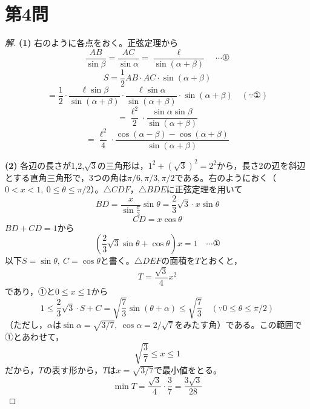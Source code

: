 \documentclass[../main.tex]{subfiles}
\begin{document}
\newpage

\section*{第4問}

\begin{proof}[解]
  \textbf{(1)} 右のように各点をおく。正弦定理から
  \[
    \frac{AB}{\sin\beta}=\frac{AC}{\sin\alpha}=\frac{\ell}{\sin(\alpha+\beta)} \quad\cdots\text{①}
  \]
  \[
    S=\frac12AB\cdot AC\cdot\sin(\alpha+\beta)
  \]
  \[
    =\frac12\cdot\frac{\ell\sin\beta}{\sin(\alpha+\beta)}\cdot\frac{\ell\sin\alpha}{\sin(\alpha+\beta)}\cdot\sin(\alpha+\beta) \quad(\because①)
  \]
  \[
    =\frac{\ell^2}{2}\cdot\frac{\sin\alpha\sin\beta}{\sin(\alpha+\beta)}
  \]
  \[
    =\frac{\ell^2}{4}\cdot\frac{\cos(\alpha-\beta)-\cos(\alpha+\beta)}{\sin(\alpha+\beta)}
  \]

  \textbf{(2)} 各辺の長さが1,2,$\sqrt3$の三角形は，$1^2+(\sqrt3)^2=2^2$から，長さ2の辺を斜辺とする直角三角形で，3つの角は$\pi/6,\pi/3,\pi/2$である。右のようにおく（$0<x<1,\ 0\le\theta\le\pi/2$）。$\triangle CDF$，$\triangle BDE$に正弦定理を用いて
  \[
    BD=\frac{x}{\sin\frac\pi3}\sin\theta=\frac23\sqrt3\cdot x\sin\theta
  \]
  \[
    CD=x\cos\theta
  \]
  $BD+CD=1$から
  \[
    \left(\frac23\sqrt3\sin\theta+\cos\theta\right)x=1 \quad\cdots\text{①}
  \]
  以下$S=\sin\theta,\ C=\cos\theta$と書く。$\triangle DEF$の面積を$T$とおくと，
  \[
    T=\frac{\sqrt3}{4}x^2
  \]
  であり，①と$0\le x\le1$から
  \[
    1\le\frac23\sqrt3\cdot S+C=\sqrt{\frac73}\sin(\theta+\alpha)\le\sqrt{\frac73} \quad(\because0\le\theta\le\pi/2)
  \]
  （ただし，$\alpha$は$\sin\alpha=\sqrt{3/7},\ \cos\alpha=2/\sqrt7$をみたす角）である。この範囲で①とあわせて，
  \[
    \sqrt{\frac37}\le x\le1
  \]
  だから，$T$の表す形から，$T$は$x=\sqrt{3/7}$で最小値をとる。
  \[
    \min T=\frac{\sqrt3}{4}\cdot\frac37=\frac{3\sqrt3}{28}
  \]
\end{proof}
\end{document}
